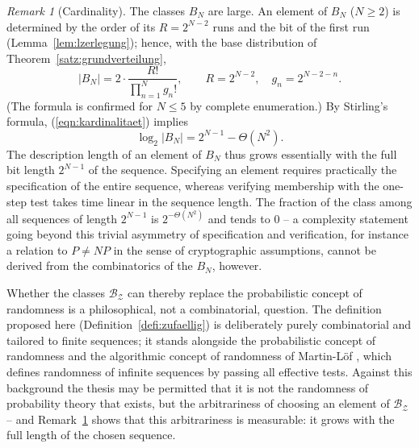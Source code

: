 \documentclass[11pt,a4paper]{scrartcl}
\theoremstyle{plain}
\theoremstyle{definition}
\theoremstyle{remark}
\newtheorem{bem}[satz]{Remark}
\begin{document}
\begin{bem}[Cardinality]\label{bem:kardinalitaet}
The classes $B_N$ are large. An element of $B_N$ ($N\geq 2$) is
determined by the order of its $R=2^{N-2}$ runs and the bit of the
first run (Lemma~\ref{lem:lzerlegung}); hence, with the base
distribution of Theorem~\ref{satz:grundverteilung},
\begin{equation}\label{eqn:kardinalitaet}
  \left|B_N\right|
  = 2\cdot\frac{R!}{\prod_{n=1}^{N} g_n!},
  \qquad R=2^{N-2},\quad g_n=2^{N-2-n}.
\end{equation}
(The formula is confirmed for $N\leq 5$ by complete enumeration.)
By Stirling's formula, (\ref{eqn:kardinalitaet}) implies
\begin{equation}\label{eqn:kardinalitaetasymptotik}
  \log_2\left|B_N\right| = 2^{N-1}-\Theta\!\left(N^2\right).
\end{equation}
The description length of an element of $B_N$ thus grows essentially
with the full bit length $2^{N-1}$ of the sequence. Specifying an
element requires practically the specification of the entire
sequence, whereas verifying membership with the one-step test takes
time linear in the sequence length. The fraction of the class among
all sequences of length $2^{N-1}$ is $2^{-\Theta(N^2)}$ and tends to
$0$ -- a complexity statement going beyond this trivial asymmetry of
specification and verification, for instance a relation to
$P\neq NP$ in the sense of cryptographic assumptions, cannot be
derived from the combinatorics of the $B_N$, however.
\end{bem}

\noindent Whether the classes $\mathcal{B_Z}$ can thereby replace
the probabilistic concept of randomness is a philosophical, not a
combinatorial, question. The definition proposed here
(Definition~\ref{defi:zufaellig}) is deliberately purely
combinatorial and tailored to finite sequences; it stands alongside
the probabilistic concept of randomness \cite{kolmogoroff1933} and
the algorithmic concept of randomness of Martin-Löf
\cite{martinloef1966}, which defines randomness of infinite sequences
by passing all effective tests. Against this background the thesis
may be permitted that it is not the randomness of probability theory
that exists, but the arbitrariness of choosing an element of
$\mathcal{B_Z}$ -- and Remark~\ref{bem:kardinalitaet} shows that this
arbitrariness is measurable: it grows with the full length of the
chosen sequence.

\end{document}
